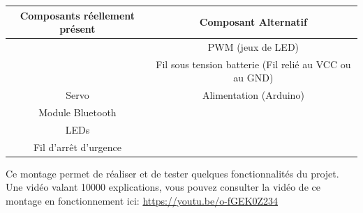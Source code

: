   			\begin{table}[hb]\begin{center}
	  			\begin{tabular}{c|c}
	  			Composants réellement présent & Composant Alternatif\\
	  			\hline
	  			\pic & PWM (jeux de LED) \\ 
	  			\dspic & Fil sous tension batterie (Fil relié au VCC ou au GND)\\
	  			 Servo &  Alimentation (Arduino) \\
	  			 Module Bluetooth &\\ 
	  			 LEDs &\\
	  			 Fil d'arrêt d'urgence &\\
	  			
	  			\end{tabular}\end{center}
  			\end{table}
 Ce montage permet de réaliser et de tester quelques fonctionnalités du projet. Une vidéo valant 10000 explications, vous pouvez consulter la vidéo de ce montage en fonctionnement ici: \url{ https://youtu.be/o-fGEK0Z234}
